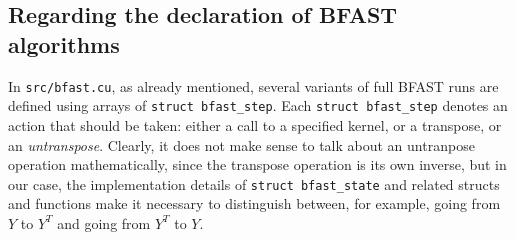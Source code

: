 \subsection{Regarding the declaration of BFAST algorithms}
In \texttt{src/bfast.cu}, as already mentioned, several variants of full BFAST
runs are defined using arrays of \texttt{struct bfast\_step}.
Each \texttt{struct bfast\_step} denotes an action that should be taken: either
a call to a specified kernel, or a transpose, or an \textit{untranspose}.
Clearly, it does not make sense to talk about an untranpose operation
mathematically, since the transpose operation is its own inverse, but in our
case, the implementation details of \texttt{struct bfast\_state} and related
structs and functions make it necessary to distinguish between, for example,
going from \(Y\) to \(Y^T\) and going from \(Y^T\) to \(Y\).


